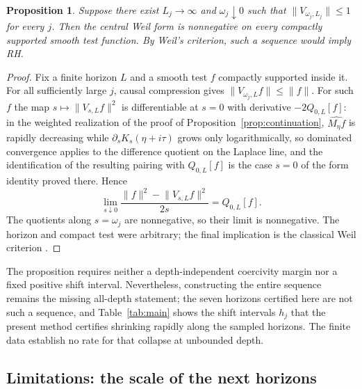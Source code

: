 \documentclass[11pt]{article}
\numberwithin{equation}{section}
\newtheorem{proposition}[theorem]{Proposition}
\theoremstyle{definition}
\theoremstyle{remark}
\newcommand{\norm}[1]{\lVert#1\rVert}
\begin{document}
\begin{proposition}\label{prop:diagonal}
Suppose there exist $L_j\to\infty$ and $\omega_j\downarrow0$ such that
$\norm{V_{\omega_j,L_j}}\le1$ for every $j$. Then the central Weil form
is nonnegative on every compactly supported smooth test function.
By Weil's criterion, such a sequence would imply RH.
\end{proposition}
\begin{proof}
Fix a finite horizon $L$ and a smooth test $f$ compactly supported inside it.
For all sufficiently large $j$, causal compression gives
$\norm{V_{\omega_j,L}f}\le\norm f$.
For such $f$ the map $s\mapsto\norm{V_{s,L}f}^2$ is differentiable at $s=0$
with derivative $-2Q_{0,L}[f]$: in the weighted realization of the proof of
Proposition~\ref{prop:continuation}, $\widehat{M_\eta f}$ is rapidly
decreasing while $\partial_sK_s(\eta+i\tau)$ grows only logarithmically, so
dominated convergence applies to the difference quotient on the Laplace line,
and the identification of the resulting pairing with $Q_{0,L}[f]$ is the case
$s=0$ of the form identity proved there. Hence
\[
 \lim_{s\downarrow0}\frac{\norm f^2-\norm{V_{s,L}f}^2}{2s}
 =Q_{0,L}[f].
\]
The quotients along $s=\omega_j$ are nonnegative, so their limit is
nonnegative. The horizon and compact test were arbitrary; the final
implication is the classical Weil criterion
\cite{ConnesConsani2020,Conrey2019}.
\end{proof}

The proposition requires neither a depth-independent coercivity margin nor
a fixed positive shift interval. Nevertheless, constructing the entire
sequence remains the missing all-depth statement; the seven horizons certified
here are not such a sequence, and Table~\ref{tab:main} shows the shift
intervals $h_j$ that the present method certifies shrinking rapidly along the
sampled horizons. The finite data establish no rate for that collapse at
unbounded depth.

\subsection{Limitations: the scale of the next horizons}\label{sec:limits}
\end{document}

